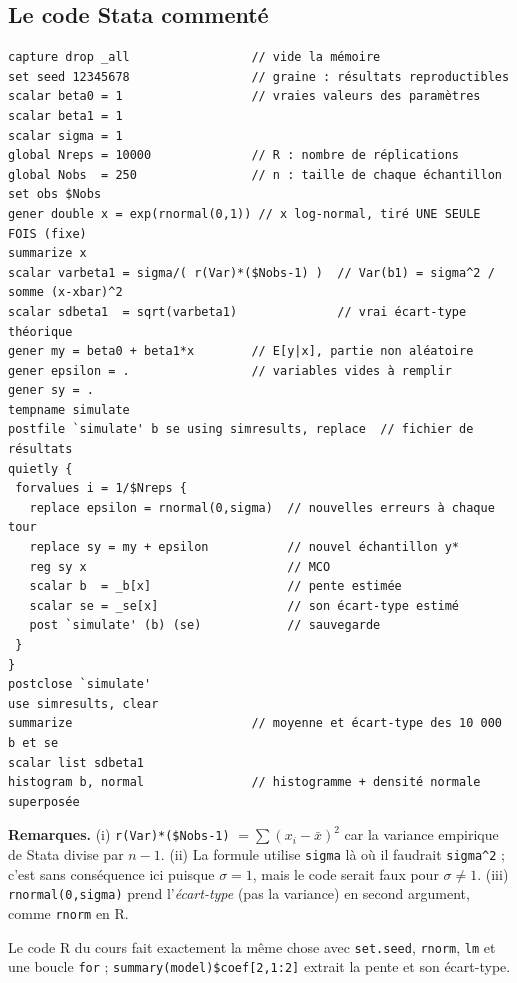 \documentclass[11pt,a4paper]{article}
\begin{document}
\subsection{Le code Stata commenté}
\begin{lstlisting}
capture drop _all                 // vide la mémoire
set seed 12345678                 // graine : résultats reproductibles
scalar beta0 = 1                  // vraies valeurs des paramètres
scalar beta1 = 1
scalar sigma = 1
global Nreps = 10000              // R : nombre de réplications
global Nobs  = 250                // n : taille de chaque échantillon
set obs $Nobs
gener double x = exp(rnormal(0,1)) // x log-normal, tiré UNE SEULE FOIS (fixe)
summarize x
scalar varbeta1 = sigma/( r(Var)*($Nobs-1) )  // Var(b1) = sigma^2 / somme (x-xbar)^2
scalar sdbeta1  = sqrt(varbeta1)              // vrai écart-type théorique
gener my = beta0 + beta1*x        // E[y|x], partie non aléatoire
gener epsilon = .                 // variables vides à remplir
gener sy = .
tempname simulate
postfile `simulate' b se using simresults, replace  // fichier de résultats
quietly {
 forvalues i = 1/$Nreps {
   replace epsilon = rnormal(0,sigma)  // nouvelles erreurs à chaque tour
   replace sy = my + epsilon           // nouvel échantillon y*
   reg sy x                            // MCO
   scalar b  = _b[x]                   // pente estimée
   scalar se = _se[x]                  // son écart-type estimé
   post `simulate' (b) (se)            // sauvegarde
 }
}
postclose `simulate'
use simresults, clear
summarize                         // moyenne et écart-type des 10 000 b et se
scalar list sdbeta1
histogram b, normal               // histogramme + densité normale superposée
\end{lstlisting}
\textbf{Remarques.} (i) \texttt{r(Var)*(\$Nobs-1)} $=\sum(x_i-\bar x)^2$ car la variance empirique de Stata divise par $n-1$. (ii) La formule utilise \texttt{sigma} là où il faudrait \texttt{sigma\^{}2} ; c'est sans conséquence ici puisque $\sigma=1$, mais le code serait faux pour $\sigma\neq1$. (iii) \texttt{rnormal(0,sigma)} prend l'\emph{écart-type} (pas la variance) en second argument, comme \texttt{rnorm} en R.

Le code R du cours fait exactement la même chose avec \texttt{set.seed}, \texttt{rnorm}, \texttt{lm} et une boucle \texttt{for} ; \texttt{summary(model)\$coef[2,1:2]} extrait la pente et son écart-type.
\end{document}
